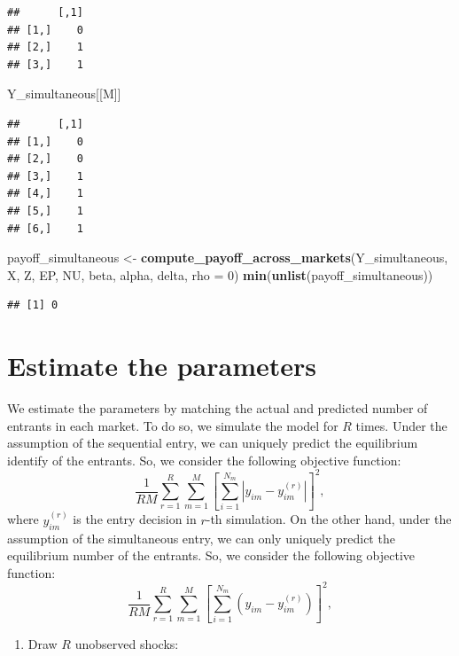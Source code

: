 \documentclass[]{book}
\newenvironment{Shaded}{\begin{snugshade}}{\end{snugshade}}
\newcommand{\KeywordTok}[1]{\textcolor[rgb]{0.13,0.29,0.53}{\textbf{#1}}}
\newcommand{\DataTypeTok}[1]{\textcolor[rgb]{0.13,0.29,0.53}{#1}}
\newcommand{\DecValTok}[1]{\textcolor[rgb]{0.00,0.00,0.81}{#1}}
\newcommand{\StringTok}[1]{\textcolor[rgb]{0.31,0.60,0.02}{#1}}
\newcommand{\NormalTok}[1]{#1}
\providecommand{\tightlist}{%
  \setlength{\itemsep}{0pt}\setlength{\parskip}{0pt}}
\begin{document}
\begin{verbatim}
##      [,1]
## [1,]    0
## [2,]    1
## [3,]    1
\end{verbatim}

\begin{Shaded}
\begin{Highlighting}[]
\NormalTok{Y_simultaneous[[M]]}
\end{Highlighting}
\end{Shaded}

\begin{verbatim}
##      [,1]
## [1,]    0
## [2,]    0
## [3,]    1
## [4,]    1
## [5,]    1
## [6,]    1
\end{verbatim}

\begin{Shaded}
\begin{Highlighting}[]
\NormalTok{payoff_simultaneous <-}
\StringTok{  }\KeywordTok{compute_payoff_across_markets}\NormalTok{(Y_simultaneous, X, Z, EP, NU, beta, alpha, delta, }\DataTypeTok{rho =} \DecValTok{0}\NormalTok{)}
\KeywordTok{min}\NormalTok{(}\KeywordTok{unlist}\NormalTok{(payoff_simultaneous))}
\end{Highlighting}
\end{Shaded}

\begin{verbatim}
## [1] 0
\end{verbatim}

\section{Estimate the parameters}\label{estimate-the-parameters-4}

We estimate the parameters by matching the actual and predicted number
of entrants in each market. To do so, we simulate the model for \(R\)
times. Under the assumption of the sequential entry, we can uniquely
predict the equilibrium identify of the entrants. So, we consider the
following objective function: \[
\frac{1}{RM}\sum_{r = 1}^R \sum_{m = 1}^M \left[\sum_{i = 1}^{N_m}|y_{im} - y_{im}^{(r)}| \right]^2,
\] where \(y_{im}^{(r)}\) is the entry decision in \(r\)-th simulation.
On the other hand, under the assumption of the simultaneous entry, we
can only uniquely predict the equilibrium number of the entrants. So, we
consider the following objective function: \[
\frac{1}{RM}\sum_{r = 1}^R \sum_{m = 1}^M \left[\sum_{i = 1}^{N_m}(y_{im} - y_{im}^{(r)}) \right]^2,
\]

\begin{enumerate}
\def\labelenumi{\arabic{enumi}.}
\tightlist
\item
  Draw \(R\) unobserved shocks:
\end{enumerate}
\end{document}
